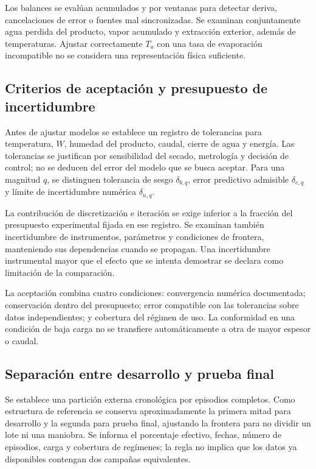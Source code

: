Los balances se evalúan acumulados y por ventanas para detectar deriva, cancelaciones de error o fuentes mal sincronizadas. Se examinan conjuntamente agua perdida del producto, vapor acumulado y extracción exterior, además de temperaturas. Ajustar correctamente $T_a$ con una tasa de evaporación incompatible no se considera una representación física suficiente.

\subsection{Criterios de aceptación y presupuesto de incertidumbre}

Antes de ajustar modelos se establece un registro de tolerancias para temperatura, $W$, humedad del producto, caudal, cierre de agua y energía. Las tolerancias se justifican por sensibilidad del secado, metrología y decisión de control; no se deducen del error del modelo que se busca aceptar. Para una magnitud $q$, se distinguen tolerancia de sesgo $\delta_{b,q}$, error predictivo admisible $\delta_{e,q}$ y límite de incertidumbre numérica $\delta_{n,q}$.

La contribución de discretización e iteración se exige inferior a la fracción del presupuesto experimental fijada en ese registro. Se examinan también incertidumbre de instrumentos, parámetros y condiciones de frontera, manteniendo sus dependencias cuando se propagan. Una incertidumbre instrumental mayor que el efecto que se intenta demostrar se declara como limitación de la comparación.

La aceptación combina cuatro condiciones: convergencia numérica documentada; conservación dentro del presupuesto; error compatible con las tolerancias sobre datos independientes; y cobertura del régimen de uso. La conformidad en una condición de baja carga no se transfiere automáticamente a otra de mayor espesor o caudal.

\subsection{Separación entre desarrollo y prueba final}
\label{met:particion}

Se establece una partición externa cronológica por episodios completos. Como estructura de referencia se conserva aproximadamente la primera mitad para desarrollo y la segunda para prueba final, ajustando la frontera para no dividir un lote ni una maniobra. Se informa el porcentaje efectivo, fechas, número de episodios, carga y cobertura de regímenes; la regla no implica que los datos ya disponibles contengan dos campañas equivalentes.

